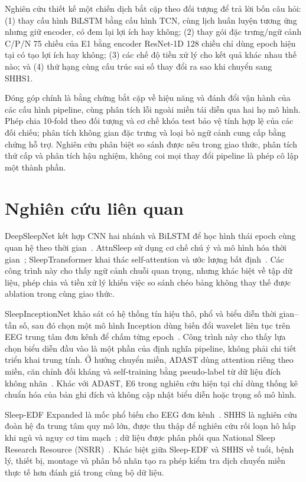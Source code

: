 \documentclass[10pt,a4paper]{article}
\begin{document}
Nghiên cứu thiết kế một chiến dịch bắt cặp theo đối tượng để trả lời bốn câu hỏi: (1) thay cấu hình BiLSTM bằng cấu hình TCN, cùng lịch huấn luyện tương ứng nhưng giữ encoder, có đem lại lợi ích hay không; (2) thay gói đặc trưng/ngữ cảnh C/P/N 75 chiều của E1 bằng encoder ResNet-1D 128 chiều chỉ dùng epoch hiện tại có tạo lợi ích hay không; (3) các chế độ tiền xử lý cho kết quả khác nhau thế nào; và (4) thứ hạng cùng cấu trúc sai số thay đổi ra sao khi chuyển sang SHHS1.

Đóng góp chính là bằng chứng bắt cặp về hiệu năng và đánh đổi vận hành của các cấu hình pipeline, cùng phân tích lỗi ngoài miền tái diễn qua hai họ mô hình. Phép chia 10-fold theo đối tượng và cơ chế khóa test bảo vệ tính hợp lệ của các đối chiếu; phân tích không gian đặc trưng và loại bỏ ngữ cảnh cung cấp bằng chứng hỗ trợ. Nghiên cứu phân biệt so sánh được nêu trong giao thức, phân tích thứ cấp và phân tích hậu nghiệm, không coi mọi thay đổi pipeline là phép cô lập một thành phần.

\section{Nghiên cứu liên quan}

DeepSleepNet kết hợp CNN hai nhánh và BiLSTM để học hình thái epoch cùng quan hệ theo thời gian~\cite{supratak2017deepsleepnet}. AttnSleep sử dụng cơ chế chú ý và mô hình hóa thời gian~\cite{eldele2021attnsleep}; SleepTransformer khai thác self-attention và ước lượng bất định~\cite{phan2022sleeptransformer}. Các công trình này cho thấy ngữ cảnh chuỗi quan trọng, nhưng khác biệt về tập dữ liệu, phép chia và tiền xử lý khiến việc so sánh chéo bảng không thay thế được ablation trong cùng giao thức.

SleepInceptionNet khảo sát có hệ thống tín hiệu thô, phổ và biểu diễn thời gian--tần số, sau đó chọn một mô hình Inception dùng biến đổi wavelet liên tục trên EEG trung tâm đơn kênh để chấm từng epoch~\cite{haghayegh2023sleepinceptionnet}. Công trình này cho thấy lựa chọn biểu diễn đầu vào là một phần của định nghĩa pipeline, không phải chi tiết triển khai trung tính. Ở hướng chuyển miền, ADAST dùng attention riêng theo miền, căn chỉnh đối kháng và self-training bằng pseudo-label từ dữ liệu đích không nhãn~\cite{eldele2023adast}. Khác với ADAST, E6 trong nghiên cứu hiện tại chỉ dùng thống kê chuẩn hóa của bản ghi đích và không cập nhật biểu diễn hoặc trọng số mô hình.

Sleep-EDF Expanded là mốc phổ biến cho EEG đơn kênh~\cite{kemp2000sleepEDF,physionetSleepEDF}. SHHS là nghiên cứu đoàn hệ đa trung tâm quy mô lớn, được thu thập để nghiên cứu rối loạn hô hấp khi ngủ và nguy cơ tim mạch~\cite{quan1997shhs}; dữ liệu được phân phối qua National Sleep Research Resource (NSRR)~\cite{zhang2018nsrr}. Khác biệt giữa Sleep-EDF và SHHS về tuổi, bệnh lý, thiết bị, montage và phân bố nhãn tạo ra phép kiểm tra dịch chuyển miền thực tế hơn đánh giá trong cùng bộ dữ liệu.
\end{document}
